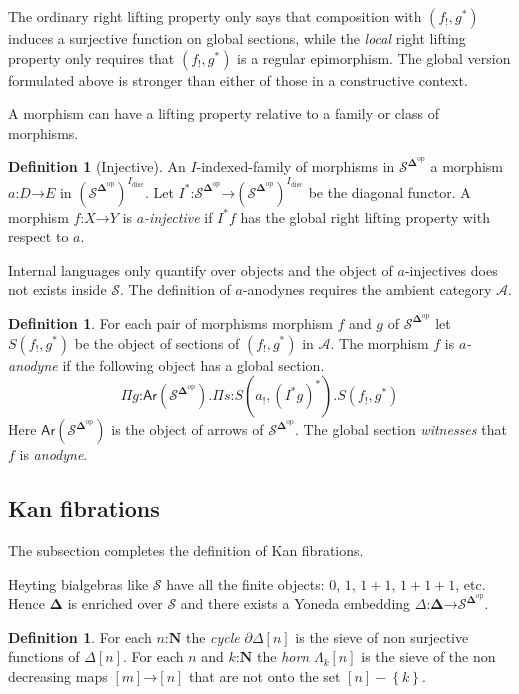 \documentclass{amsart}
\theoremstyle{plain}
\theoremstyle{definition}
\newtheorem{defin}[theorem]{Definition}
\newcommand\hide[1]{}
\newcommand\cat\mathcal
\newcommand\set[1]{\left\{#1\right\}}
\newcommand\ri{^*}
\newcommand\nno{\mathbf N}
\newcommand\dual{^{\mathrm{op}}}
\newcommand\disc{_{\mathrm{disc}}}
\newcommand\simCat{\mathbf\Delta}
\newcommand\s{^{\simCat\dual}}
\newcommand\of{\mathord:}
\renewcommand\to{\mathord\rightarrow}
\newcommand\simplex\Delta
\newcommand\cycle{\partial\Delta}
\newcommand\horn\Lambda
\begin{document}
The ordinary right lifting property only says that composition with $(f_!,g\ri)$ induces a surjective function on global sections, while the \emph{local} right lifting property only requires that $(f_!,g\ri)$ is a regular epimorphism. The global version formulated above is stronger than either of those in a constructive context.

A morphism can have a lifting property relative to a family or class of morphisms.

\begin{defin}[Injective] An $I$-indexed-family of morphisms in $\cat S\s$ a morphism $a\of D\to E$ in $(\cat S\s)^{I\disc}$. Let $I\ri\of\cat S\s\to (\cat S\s)^{I\disc}$ be the diagonal functor. A morphism $f\of X\to Y$ is \emph{$a$-injective} if $I\ri f$ has the global right lifting property with respect to $a$. \end{defin}

\hide{Add?: These injectives satisfy the usual properties of closure under products, composition and pullback, thanks to specific constructions on filler operators.}

Internal languages only quantify over objects and the object of $a$-injectives does not exists inside $\cat S$. The definition of $a$-anodynes requires the ambient category $\cat A$.

\newcommand\Ar{\mathsf{Ar}}
\begin{defin}
For each pair of morphisms morphism $f$ and $g$ of $\cat S\s$ let $S(f_!,g\ri)$ be the object of sections of $(f_!,g\ri)$ in $\cat A$. The morphism $f$ is \emph{$a$-anodyne} if the following object has a global section.
\[ \Pi g\of \Ar(\cat S\s).\Pi s\of S(a_!,(I\ri g)\ri).S(f_!,g\ri) \]
Here $\Ar(\cat S\s)$ is the object of arrows of $\cat S\s$. The global section \emph{witnesses} that $f$ is \emph{anodyne}. 
\end{defin}



\subsection{Kan fibrations}
The subsection completes the definition of Kan fibrations.

Heyting bialgebras like $\cat S$ have all the finite objects: $0$, $1$, $1+1$, $1+1+1$, etc. Hence $\simCat$ is enriched over $\cat S$ and there exists a Yoneda embedding $\Delta\of \simCat \to \cat S^{\simCat \dual}$. 

\begin{defin} For each $n\of \nno$ the \emph{cycle} $\cycle[n]$ is the sieve of non surjective functions of $\simplex[n]$. For each $n$ and $k\of\nno$ the \emph{horn} $\horn_k[n]$ is the sieve of the non decreasing maps $[m]\to [n]$ that are not onto the set $[n]-\set{k}$. 
\end{defin}
\end{document}
